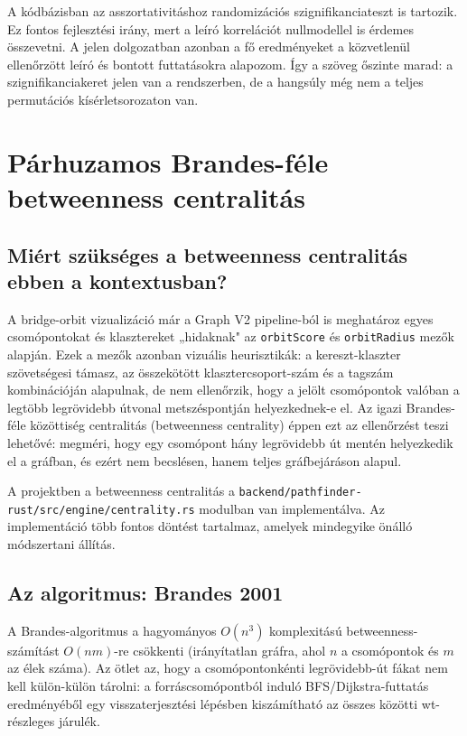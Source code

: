 ﻿\documentclass[a4paper,12pt]{report}
\begin{document}
A kódbázisban az asszortativitáshoz randomizációs szignifikanciateszt is tartozik. Ez fontos fejlesztési irány, mert a leíró korrelációt nullmodellel is érdemes összevetni. A jelen dolgozatban azonban a fő eredményeket a közvetlenül ellenőrzött leíró és bontott futtatásokra alapozom. Így a szöveg őszinte marad: a szignifikanciakeret jelen van a rendszerben, de a hangsúly még nem a teljes permutációs kísérletsorozaton van.

\chapter{Párhuzamos Brandes-féle betweenness centralitás}

\section{Miért szükséges a betweenness centralitás ebben a kontextusban?}

A bridge-orbit vizualizáció már a Graph V2 pipeline-ból is meghatároz egyes csomópontokat és klasztereket „hidaknak" az \texttt{orbitScore} és \texttt{orbitRadius} mezők alapján. Ezek a mezők azonban vizuális heurisztikák: a kereszt-klaszter szövetségesi támasz, az összekötött klasztercsoport-szám és a tagszám kombinációján alapulnak, de nem ellenőrzik, hogy a jelölt csomópontok valóban a legtöbb legrövidebb útvonal metszéspontján helyezkednek-e el. Az igazi Brandes-féle közöttiség centralitás (betweenness centrality) éppen ezt az ellenőrzést teszi lehetővé: megméri, hogy egy csomópont hány legrövidebb út mentén helyezkedik el a gráfban, és ezért nem becslésen, hanem teljes gráfbejáráson alapul.

A projektben a betweenness centralitás a \texttt{backend/pathfinder-rust/src/engine/centrality.rs} modulban van implementálva. Az implementáció több fontos döntést tartalmaz, amelyek mindegyike önálló módszertani állítás.

\section{Az algoritmus: Brandes 2001}

A Brandes-algoritmus \cite{brandes2001} a hagyományos $O(n^3)$ komplexitású betweenness-számítást $O(nm)$-re csökkenti (irányítatlan gráfra, ahol $n$ a csomópontok és $m$ az élek száma). Az ötlet az, hogy a csomópontonkénti legrövidebb-út fákat nem kell külön-külön tárolni: a forráscsomópontból induló BFS/Dijkstra-futtatás eredményéből egy visszaterjesztési lépésben kiszámítható az összes közötti wt-részleges járulék.
\end{document}
